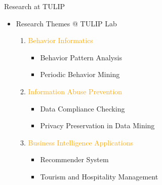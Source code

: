 \documentclass[
 size=14pt,
 paper=smartboard,  %
 mode=present, 		%
 display=slides, 	%
 style=tuliplab,  	%
 pauseslide,
 fleqn,leqno]{powerdot}
\begin{document}
\begin{slide}[toc=,bm=]{Research at TULIP}
\begin{itemize}
    \item<1->
    Research Themes @ TULIP Lab
    \begin{enumerate}
        \item<2->
        \textcolor{orange}{Behavior Informatics}
            \begin{itemize}
                \item<2->
                Behavior Pattern Analysis

                \item<2->
                Periodic Behavior Mining
            \end{itemize}

        \item<3->
        \textcolor{orange}{Information Abuse Prevention}
            \begin{itemize}
                \item<3->
                Data Compliance Checking

                \item<3->
                Privacy Preservation in Data Mining
            \end{itemize}
        \item<4->
        \textcolor{orange}{Business Intelligence Applications}
            \begin{itemize}
                \item<4->
                Recommender System

                \item<4->
                Tourism and Hospitality Management
            \end{itemize}
    \end{enumerate}
\end{itemize}
\end{slide}
\end{document}
